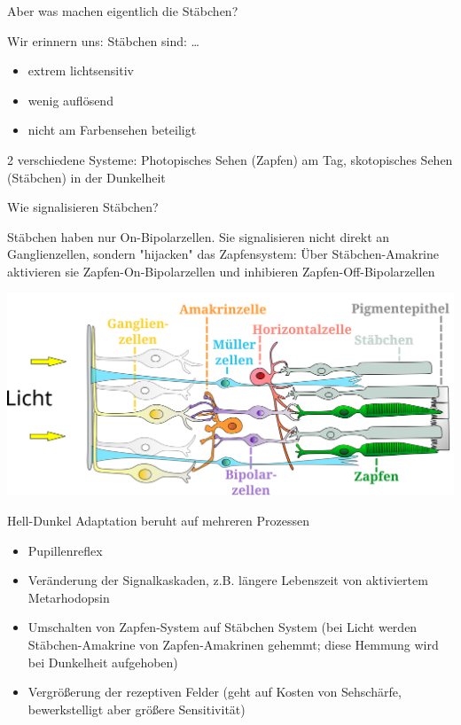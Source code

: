 \documentclass{beamer}
\begin{document}

\begin{frame}{Aber was machen eigentlich die Stäbchen?}

Wir erinnern uns: Stäbchen sind: \dots

\pause

\begin{itemize}
    \item 
    extrem lichtsensitiv
    \item
    wenig auflösend
    \item
    nicht am Farbensehen beteiligt
\end{itemize}

\pause

2 verschiedene Systeme: Photopisches Sehen (Zapfen) am Tag, skotopisches Sehen (Stäbchen) in der Dunkelheit
    
\end{frame}

\begin{frame}{Wie signalisieren Stäbchen?}
    
    Stäbchen haben nur On-Bipolarzellen. Sie signalisieren nicht direkt an Ganglienzellen, sondern "hijacken" das Zapfensystem: Über Stäbchen-Amakrine aktivieren sie Zapfen-On-Bipolarzellen und inhibieren Zapfen-Off-Bipolarzellen
    
    \begin{center}
        \includegraphics[width=\textwidth]{Retina_de.png}
    \end{center}
    
\end{frame}




\begin{frame}{Hell-Dunkel Adaptation beruht auf mehreren Prozessen}

\begin{itemize}
    \item 
    Pupillenreflex
\item
Veränderung der Signalkaskaden, z.B. längere Lebenszeit von aktiviertem Metarhodopsin
\item
Umschalten von Zapfen-System auf Stäbchen System (bei Licht werden Stäbchen-Amakrine von Zapfen-Amakrinen gehemmt; diese Hemmung wird bei Dunkelheit aufgehoben)
\item
Vergrößerung der rezeptiven Felder (geht auf Kosten von Sehschärfe, bewerkstelligt aber größere Sensitivität)
\end{itemize}

    
\end{frame}
\end{document}
